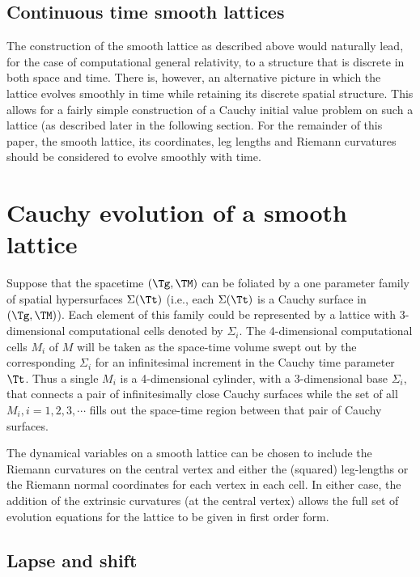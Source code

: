 \documentclass[a4paper,12pt]{article}
\numberwithin{equation}{section}
\begin{document}
\subsection{Continuous time smooth lattices}
\label{sec:ContinuousTime}
The construction of the smooth lattice as described above would naturally lead, for the case
of computational general relativity, to a structure that is discrete in both space and time.
There is, however, an alternative picture in which the lattice evolves smoothly in time
while retaining its discrete spatial structure. This allows for a fairly simple construction
of a Cauchy initial value problem on such a lattice (as described later in the following
section. For the remainder of this paper, the smooth lattice, its coordinates, leg lengths
and Riemann curvatures should be considered to evolve smoothly with time.

\section{Cauchy evolution of a smooth lattice}
\label{sec:CauchyEvol}

Suppose that the spacetime $(\Tg,\TM)$ can be foliated by a one parameter family of spatial
hypersurfaces $\Sigma(\Tt)$ (i.e., each $\Sigma(\Tt)$ is a Cauchy surface in $(\Tg,\TM)$).
Each element of this family could be represented by a lattice with 3-dimensional
computational cells denoted by $\Sigma_i$. The 4-dimensional computational cells $M_i$ of
$M$ will be taken as the space-time volume swept out by the corresponding $\Sigma_i$ for an
infinitesimal increment in the Cauchy time parameter $\Tt$. Thus a single $M_i$ is a
4-dimensional cylinder, with a 3-dimensional base $\Sigma_i$, that connects a pair of
infinitesimally close Cauchy surfaces while the set of all $M_i, i=1,2,3,\cdots$ fills out
the space-time region between that pair of Cauchy surfaces.

The dynamical variables on a smooth lattice can be chosen to include the Riemann curvatures
on the central vertex and either the (squared) leg-lengths or the Riemann normal coordinates
for each vertex in each cell. In either case, the addition of the extrinsic curvatures (at
the central vertex) allows the full set of evolution equations for the lattice to be given
in first order form.

\subsection{Lapse and shift}
\label{sec:LapseShift}
\end{document}
